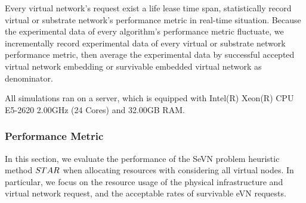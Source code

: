 Every virtual network's request exist a life lease time span, statistically record virtual or substrate network's performance metric in real-time situation. Because the experimental data of every algorithm's performance metric fluctuate, we incrementally record experimental data of every virtual or substrate network performance metric, then average the experimental data by successful accepted virtual network embedding or survivable embedded virtual network  as denominator.


All simulations ran on a server, which is equipped with Intel(R) Xeon(R) CPU E5-2620 2.00GHz (24 Cores) and 32.00GB RAM.


\subsubsection{Performance Metric}
In this section, we evaluate the performance of the SeVN problem heuristic method $STAR$ when allocating resources with considering all virtual nodes. In particular, we focus on the resource usage of the physical infrastructure and virtual network request, and the acceptable rates of survivable eVN  requests.




